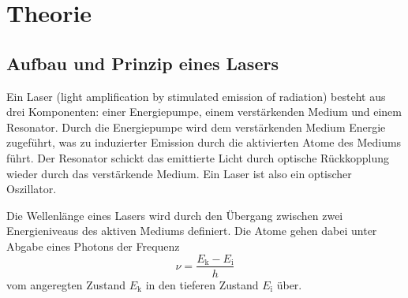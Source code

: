 
\section{Theorie}
\label{sec:Theorie}

\subsection{Aufbau und Prinzip eines Lasers}
Ein Laser (light amplification by stimulated emission of radiation) besteht aus drei Komponenten: einer Energiepumpe, einem verstärkenden Medium und einem Resonator.
Durch die Energiepumpe wird dem verstärkenden Medium Energie zugeführt, was zu induzierter Emission durch die aktivierten Atome des Mediums führt. Der Resonator schickt das emittierte Licht durch optische Rückkopplung wieder durch das verstärkende Medium. Ein Laser ist also ein optischer Oszillator. \cite{Laserspektroskopie}

Die Wellenlänge eines Lasers wird durch den Übergang zwischen zwei Energieniveaus des aktiven Mediums definiert. Die Atome gehen dabei unter Abgabe eines Photons
der Frequenz
\begin{equation*}
    \nu = \frac{E_\text{k} - E_\text{i}}{h}
\end{equation*}
vom angeregten Zustand $E_\text{k}$ in den tieferen Zustand $E_\text{i}$ über. \cite{Laserspektroskopie}



